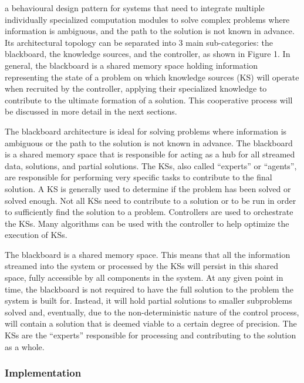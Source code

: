 \begin{summary}
a behavioural design pattern for systems that need to integrate multiple
individually specialized computation modules to solve complex problems where
information is ambiguous, and the path to the solution is not known in advance.
Its architectural topology can be separated into 3 main sub-categories: the
blackboard, the knowledge sources, and the controller, as shown in Figure 1. In
general, the blackboard is a shared memory space holding information
representing the state of a problem on which knowledge sources (KS) will
operate when recruited by the controller, applying their specialized knowledge
to contribute to the ultimate formation of a solution. This cooperative process
will be discussed in more detail in the next sections.

The blackboard architecture is ideal for solving problems where information is
ambiguous or the path to the solution is not known in advance. The blackboard
is a shared memory space that is responsible for acting as a hub for all
streamed data, solutions, and partial solutions. The KSs, also called “experts”
or “agents”, are responsible for performing very specific tasks to contribute
to the final solution. A KS is generally used to determine if the problem has
been solved or solved enough. Not all KSs need to contribute to a solution or
to be run in order to sufficiently find the solution to a problem. Controllers
are used to orchestrate the KSs. Many algorithms can be used with the
controller to help optimize the execution of KSs.

The blackboard is a shared memory space. This means that all the information
streamed into the system or processed by the KSs will persist in this shared
space, fully accessible by all components in the system. At any given point in
time, the blackboard is not required to have the full solution to the problem
the system is built for. Instead, it will hold partial solutions to smaller
subproblems solved and, eventually, due to the non-deterministic nature of the
control process, will contain a solution that is deemed viable to a certain
degree of precision. The KSs are the “experts” responsible for processing and
contributing to the solution as a whole.

\end{summary}

\subsubsection{Implementation}

